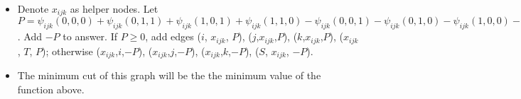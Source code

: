 \begin{itemize}[nosep]
\begin{itemize}[nosep]
      \item Denote $x_{ijk}$ as helper nodes. Let $P=\psi_{ijk}(0,0,0)+\psi_{ijk}(0,1,1)+\psi_{ijk}(1,0,1)+\psi_{ijk}(1,1,0)-\psi_{ijk}(0,0,1)-\psi_{ijk}(0,1,0)-\psi_{ijk}(1,0,0)-\psi_{ijk}(1,1,1)$. Add $-P$ to answer. If $P \geq 0$, add edges ($i$, $x_{ijk}$, $P$), ($j$,$x_{ijk}$,$P$), ($k$,$x_{ijk}$,$P$), ($x_{ijk}$, $T$, $P$); otherwise ($x_{ijk}$,$i$,$-P$), ($x_{ijk}$,$j$,$-P$), ($x_{ijk}$,$k$,$-P$), ($S$, $x_{ijk}$, $-P$).
      \item The minimum cut of this graph will be the the minimum value of the function above.
    \end{itemize}
\end{itemize}
